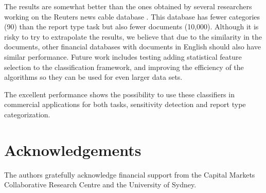 \documentclass[twocolumn]{article}
\begin{document}
The results are somewhat better than the ones obtained by several
researchers working on the Reuters news cable database \cite{calvo:00}
\cite{calvo:01}. This database has fewer categories (90) than the
report type task but also fewer documents (10,000). Although it is
risky to try to extrapolate the results, we believe that due to the
similarity in the documents, other financial databases with documents
in English should also have similar performance. Future work includes
testing adding statistical feature selection to the classification
framework, and improving the efficiency of the algorithms so they can
be used for even larger data sets.

The excellent performance shows the possibility to use these
classifiers in commercial applications for both tasks, sensitivity
detection and report type categorization.


\section*{Acknowledgements}

The authors gratefully acknowledge financial support from the Capital
Markets Collaborative Research Centre and the University of Sydney.




\end{document}
